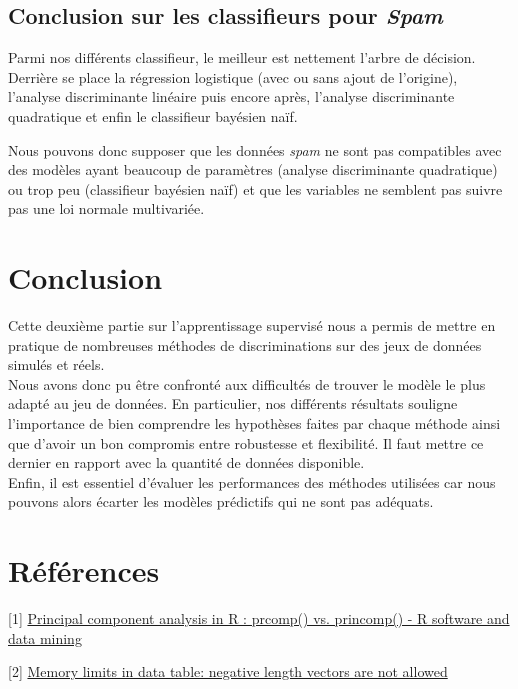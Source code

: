 \documentclass{article}
\begin{document}
\subsection*{Conclusion sur les classifieurs pour \textit{Spam}}

Parmi nos différents classifieur, le meilleur est nettement l'arbre de décision. Derrière se place la régression logistique (avec ou sans ajout de l'origine), l'analyse discriminante linéaire puis encore après, l'analyse discriminante quadratique et enfin le classifieur bayésien naïf.

Nous pouvons donc supposer que les données \textit{spam} ne sont pas compatibles avec des modèles ayant beaucoup de paramètres (analyse discriminante quadratique) ou trop peu (classifieur bayésien naïf) et que les variables ne semblent pas suivre pas une loi normale multivariée.

\section*{Conclusion}

Cette deuxième partie sur l'apprentissage supervisé nous a permis de mettre en pratique de nombreuses méthodes de discriminations sur des jeux de données simulés et réels. \\
Nous avons donc pu être confronté aux difficultés de trouver le modèle le plus adapté au jeu de données.
En particulier, nos différents résultats souligne l'importance de bien comprendre les hypothèses faites par chaque méthode ainsi que d'avoir un bon compromis entre robustesse et flexibilité. Il faut mettre ce dernier en rapport avec la quantité de données disponible.\\
Enfin, il est essentiel d'évaluer les performances des méthodes utilisées car nous pouvons alors écarter les modèles prédictifs qui ne sont pas adéquats.


\section*{Références}
[1] \href{http://www.sthda.com/english/wiki/principal-component-analysis-in-r-prcomp-vs-princomp-r-software-and-data-mining#graph-of-variables-the-correlation-circle}{Principal component analysis in R : prcomp() vs. princomp() - R software and data mining}

[2] \href{https://stackoverflow.com/questions/36842263/memory-limits-in-data-table-negative-length-vectors-are-not-allowed}{Memory limits in data table: negative length vectors are not allowed}
\end{document}
